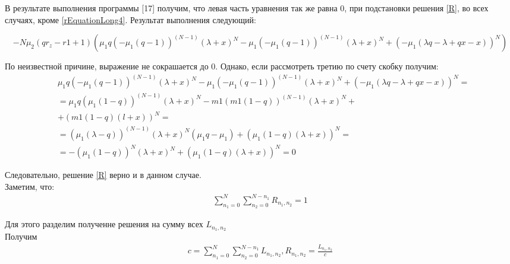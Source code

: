 В результате выполнения программы [17] получим, что левая часть уравнения так же равна 0, при подстановки решения \eqref{R}, во всех случаях, кроме \eqref{rEquationLong4}.
Результат выполнения следующий:
\begin{adjustwidth}{-40pt}{100pt}
\begin{equation*}
-N\mu_{2}(qr_{z} - r{1} + 1)(\mu_{1}q(-\mu_{1}(q - 1))^{(N - 1)}(\lambda + x)^N - \mu_{1}(-\mu_{1}(q -1))^{(N - 1)}(\lambda + x)^N + (-\mu_{1}(\lambda q - \lambda + qx - x))^N)
\end{equation*}
\end{adjustwidth}
По неизвестной причине, выражение не сокрашается до 0. Однако, если рассмотреть третию по счету скобку получим:\\
\begin{align*}
	&\mu_{1}q(-\mu_{1}(q - 1))^{(N - 1)}(\lambda + x)^N - \mu_{1}(-\mu_{1}(q - 1))^{(N - 1)}(\lambda + x)^N + (-\mu_{1}(\lambda q - \lambda + qx - x))^N=\\
	&=\mu_{1}q(\mu_{1}(1-q))^{(N - 1)}(\lambda + x)^N - m1(m1(1-q))^(N - 1)(\lambda + x)^N+\\
	& + (m1(1-q)(l+x))^N=\\
	&=(\mu_{1}(\lambda-q))^{(N - 1)}(\lambda + x)^N(\mu_{1}q - \mu_{1}) + (\mu_{1}(1-q)(\lambda+x))^N=\\
	&=-(\mu_{1}(1-q))^N(\lambda + x)^N + (\mu_{1}(1-q)(\lambda+x))^N=0
\end{align*}

Следовательно, решение \eqref{R} верно и в данном случае.\\
Заметим, что:\\
\begin{align*}
\sum_{n_{1}=0}^{N}\sum_{n_{2}=0}^{N-n_{1}}R_{n_{1},n_{2}}=1
\end{align*}

Для этого разделим полученне решения на сумму всех $L_{n_{1}, n_{2}}$\\
Получим 
\begin{equation*}
	\begin{split} 
		c=\sum_{n_1=0}^N\sum_{n_2=0}^{N-n_1} L_{n_{1}, n_{2}}, R_{n_{1}, n_{2}}=\frac{L_{n_{1}, n_{2}}}{c}
	\end{split}
\end{equation*}